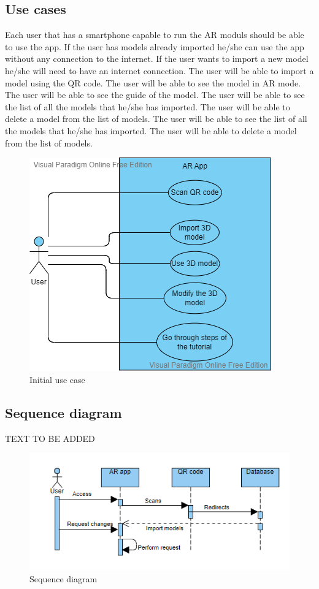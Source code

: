 \subsection{Use cases}
Each user that has a smartphone capable to run the AR moduls should be able to use the app. If the user has models already imported he/she can use the app without any connection to the internet. If the user wants to import a new model he/she will need to have an internet connection. The user will be able to import a model using the QR code. The user will be able to see the model in AR mode. The user will be able to see the guide of the model. The user will be able to see the list of all the models that he/she has imported. The user will be able to delete a model from the list of models. The user will be able to see the list of all the models that he/she has imported. The user will be able to delete a model from the list of models.
\begin{figure}[h!]
    \begin{center}
        \includegraphics{img/InitialUseCase.png}
        \caption{Initial use case}
        \label{fig:InitialUseCase}
    \end{center}
\end{figure}
\pagebreak

\subsection{Sequence diagram}
TEXT TO BE ADDED
\begin{figure}[h!]
    \begin{center}
        \includegraphics{img/SequenceDiagram.png}
        \caption{Sequence diagram}
        \label{fig:SequenceDiagram}
    \end{center}
\end{figure}

